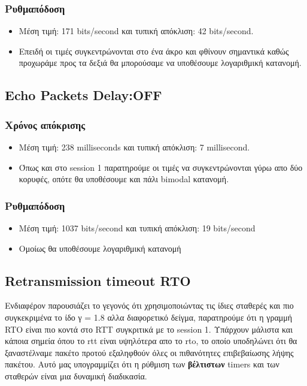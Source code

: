\documentclass[hidelinks, 12pt, a4paper]{article}
\begin{document}
\subsubsection{Ρυθμαπόδοση}

\begin{itemize}
    \item Μέση τιμή: 171 bits/second και τυπική απόκλιση: 42 bits/second.
    \item Επειδή οι τιμές συγκεντρώνονται στο ένα άκρο και φθίνουν σημαντικά καθώς προχωράμε προς τα δεξιά θα μπορούσαμε να υποθέσουμε λογαριθμική κατανομή.
\end{itemize}

\subsection{Echo Packets Delay:OFF}
\subsubsection{Χρόνος απόκρισης}

\begin{itemize}
    \item Μέση τιμή: 238 milliseconds και τυπική απόκλιση: 7 millisecond.
    \item Όπως και στο session 1 παρατηρούμε οι τιμές να συγκεντρώνονται γύρω απο δύο κορυφές, οπότε θα υποθέσουμε και πάλι bimodal κατανομή.
\end{itemize}

\subsubsection{Ρυθμαπόδοση}

\begin{itemize}
    \item Μέση τιμή: 1037 bits/second και τυπική απόκλιση: 19 bits/second
    \item Ομοίως θα υποθέσουμε λογαριθμική κατανομή
\end{itemize}

\subsection{Retransmission timeout RTO}

Ενδιαφέρον παρουσιάζει το γεγονός ότι χρησιμοποιώντας τις ίδιες σταθερές και πιο συγκεκριμένα το ίδο γ = 1.8 αλλα διαφορετικό δείγμα, παρατηρούμε ότι η γραμμή RTO είναι πιο κοντά στο RTT συγκριτικά με το session 1. Υπάρχουν μάλιστα και κάποια σημεία όπου το rtt είναι υψηλότερα απο το rto, το οποίο υποδηλώνει ότι θα ξαναστέλναμε πακέτο προτού εξαληφθούν όλες οι πιθανότητες επιβεβαίωσης λήψης πακέτου. Αυτό μας υπογραμμίζει ότι η ρύθμιση των \textbf{βέλτιστων} timers και των σταθερών είναι μια δυναμική διαδικασία.
\end{document}
